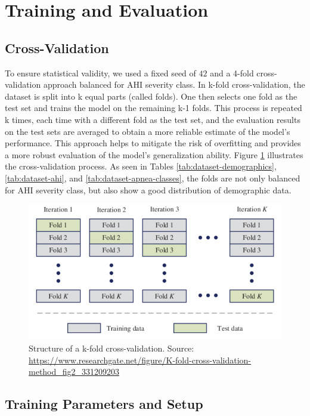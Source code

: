 \section{Training and Evaluation}

\subsection*{Cross-Validation}

To ensure statistical validity, we used a fixed seed of $42$ and a 4-fold cross-validation approach balanced for AHI severity class. In k-fold cross-validation, the dataset is split into k equal parts (called folds). One then selects one fold as the test set and trains the model on the remaining k-1 folds. This process is repeated k times, each time with a different fold as the test set, and the evaluation results on the test sets are averaged to obtain a more reliable estimate of the model's performance. This approach helps to mitigate the risk of overfitting and provides a more robust evaluation of the model's generalization ability. Figure \ref{fig:crossvalidation} illustrates the cross-validation process.
As seen in Tables \ref{tab:dataset-demographics}, \ref{tab:dataset-ahi}, and \ref{tab:dataset-apnea-classes}, the folds are not only balanced for AHI severity class, but also show a good distribution of demographic data.

\begin{figure}
    \centering
    \includegraphics[width=\textwidth]{images/CrossValidation}
    \caption{Structure of a k-fold cross-validation. Source: \url{https://www.researchgate.net/figure/K-fold-cross-validation-method\_fig2\_331209203}}
    \label{fig:crossvalidation}
\end{figure}

\subsection*{Training Parameters and Setup}

